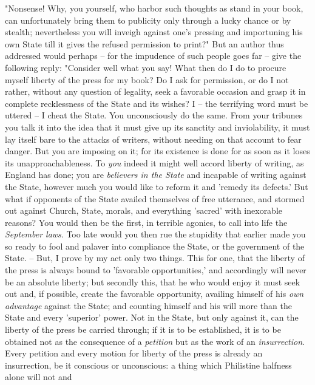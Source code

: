 \documentclass[a4paper]{book}
\begin{document}
"{}Nonsense! Why, you yourself, who harbor such thoughts as stand in your 
book, can unfortunately bring them to publicity only through a lucky chance or 
by stealth; nevertheless you will inveigh against one's pressing and 
importuning his own State till it gives the refused permission to print?"{} 
But an author thus addressed would perhaps -- for the impudence of such people 
goes far -- give the following reply: "{}Consider well what you say! What then 
do I do to procure myself liberty of the press for my book? Do I ask for 
permission, or do I not rather, without any question of legality, seek a 
favorable occasion and grasp it in complete recklessness of the State and its 
wishes? I -- the terrifying word must be uttered -- I cheat the State. You 
unconsciously do the same. From your tribunes you talk it into the idea that 
it must give up its sanctity and inviolability, it must lay itself bare to the 
attacks of writers, without needing on that account to fear danger. But you 
are imposing on it; for its existence is done for as soon as it loses its 
unapproachableness. To \textit{you} indeed it might well accord liberty of 
writing, as England has done; you are \textit{believers in the State} and 
incapable of writing against the State, however much you would like to reform 
it and 'remedy its defects.' But what if opponents of the State availed 
themselves of free utterance, and stormed out against Church, State, morals, 
and everything 'sacred' with inexorable reasons? You would then be the first, 
in terrible agonies, to call into life the \textit{September laws}. Too late 
would you then rue the stupidity that earlier made you so ready to fool and 
palaver into compliance the State, or the government of the State. -- But, I 
prove by my act only two things. This for one, that the liberty of the press 
is always bound to 'favorable opportunities,' and accordingly will never be an 
absolute liberty; but secondly this, that he who would enjoy it must seek out 
and, if possible, create the favorable opportunity, availing himself of his 
\textit{own advantage} against the State; and counting himself and his will 
more than the State and every 'superior' power. Not in the State, but only 
against it, can the liberty of the press be carried through; if it is to be 
established, it is to be obtained not as the consequence of a 
\textit{petition} but as the work of an \textit{insurrection}. Every petition 
and every motion for liberty of the press is already an insurrection, be it 
conscious or unconscious: a thing which Philistine halfness alone will not and 
\end{document}
